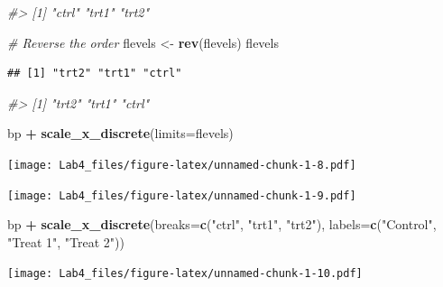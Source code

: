 \documentclass[]{article}
\newenvironment{Shaded}{\begin{snugshade}}{\end{snugshade}}
\newcommand{\KeywordTok}[1]{\textcolor[rgb]{0.13,0.29,0.53}{\textbf{#1}}}
\newcommand{\DataTypeTok}[1]{\textcolor[rgb]{0.13,0.29,0.53}{#1}}
\newcommand{\StringTok}[1]{\textcolor[rgb]{0.31,0.60,0.02}{#1}}
\newcommand{\CommentTok}[1]{\textcolor[rgb]{0.56,0.35,0.01}{\textit{#1}}}
\newcommand{\OperatorTok}[1]{\textcolor[rgb]{0.81,0.36,0.00}{\textbf{#1}}}
\newcommand{\NormalTok}[1]{#1}
\begin{document}
\begin{Shaded}
\begin{Highlighting}[]
\CommentTok{#> [1] "ctrl" "trt1" "trt2"}

\CommentTok{# Reverse the order}
\NormalTok{flevels <-}\StringTok{ }\KeywordTok{rev}\NormalTok{(flevels)}
\NormalTok{flevels}
\end{Highlighting}
\end{Shaded}

\begin{verbatim}
## [1] "trt2" "trt1" "ctrl"
\end{verbatim}

\begin{Shaded}
\begin{Highlighting}[]
\CommentTok{#> [1] "trt2" "trt1" "ctrl"}

\NormalTok{bp }\OperatorTok{+}\StringTok{ }\KeywordTok{scale_x_discrete}\NormalTok{(}\DataTypeTok{limits=}\NormalTok{flevels)}
\end{Highlighting}
\end{Shaded}

\texttt{[image: Lab4\_files/figure-latex/unnamed-chunk-1-8.pdf]}

\begin{Shaded}
\end{Shaded}

\texttt{[image: Lab4\_files/figure-latex/unnamed-chunk-1-9.pdf]}

\begin{Shaded}
\begin{Highlighting}[]
\NormalTok{bp }\OperatorTok{+}\StringTok{ }\KeywordTok{scale_x_discrete}\NormalTok{(}\DataTypeTok{breaks=}\KeywordTok{c}\NormalTok{(}\StringTok{"ctrl"}\NormalTok{, }\StringTok{"trt1"}\NormalTok{, }\StringTok{"trt2"}\NormalTok{),}
                      \DataTypeTok{labels=}\KeywordTok{c}\NormalTok{(}\StringTok{"Control"}\NormalTok{, }\StringTok{"Treat 1"}\NormalTok{, }\StringTok{"Treat 2"}\NormalTok{))}
\end{Highlighting}
\end{Shaded}

\texttt{[image: Lab4\_files/figure-latex/unnamed-chunk-1-10.pdf]}
\end{document}
